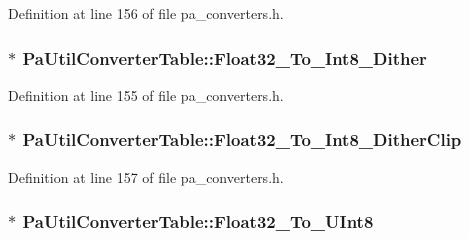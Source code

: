 Definition at line 156 of file pa\+\_\+converters.\+h.

\subsubsection[{\texorpdfstring{Float32\+\_\+\+To\+\_\+\+Int8\+\_\+\+Dither}{Float32_To_Int8_Dither}}]{$\ast$ Pa\+Util\+Converter\+Table\+::\+Float32\+\_\+\+To\+\_\+\+Int8\+\_\+\+Dither}\hypertarget{struct_pa_util_converter_table_a206dcfac5181a45ef22c3f88411989e5}{}\label{struct_pa_util_converter_table_a206dcfac5181a45ef22c3f88411989e5}


Definition at line 155 of file pa\+\_\+converters.\+h.

\subsubsection[{\texorpdfstring{Float32\+\_\+\+To\+\_\+\+Int8\+\_\+\+Dither\+Clip}{Float32_To_Int8_DitherClip}}]{$\ast$ Pa\+Util\+Converter\+Table\+::\+Float32\+\_\+\+To\+\_\+\+Int8\+\_\+\+Dither\+Clip}\hypertarget{struct_pa_util_converter_table_aac911fb6884627bc329a8c8cb74a7f23}{}\label{struct_pa_util_converter_table_aac911fb6884627bc329a8c8cb74a7f23}


Definition at line 157 of file pa\+\_\+converters.\+h.

\subsubsection[{\texorpdfstring{Float32\+\_\+\+To\+\_\+\+U\+Int8}{Float32_To_UInt8}}]{$\ast$ Pa\+Util\+Converter\+Table\+::\+Float32\+\_\+\+To\+\_\+\+U\+Int8}\hypertarget{struct_pa_util_converter_table_a16cb19ba65abf6fb4cca324e3836b937}{}\label{struct_pa_util_converter_table_a16cb19ba65abf6fb4cca324e3836b937}


